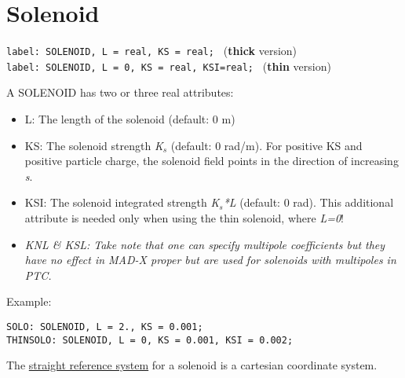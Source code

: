 
\section{Solenoid}
\label{sec:solenoid}

\texttt{label: SOLENOID, L = real, KS = real;           } (\textbf{thick} version) 
\\
\texttt{label: SOLENOID, L = 0,    KS = real, KSI=real; } (\textbf{thin} version) 

A SOLENOID has two or three real attributes: 
\begin{itemize}
   \item L: The length of the solenoid (default: 0 m) 
   \item KS: The solenoid strength \textit{K$_s$} (default: 0
     rad/m). For positive KS and positive particle charge, the solenoid
     field points in the direction of increasing \textit{s}.  
   \item KSI: The solenoid integrated strength \textit{K$_s$*L}
     (default: 0 rad).  This additional attribute is needed only when
     using the thin solenoid,  where \textit{L=0}!     
   \item \textit{ KNL \& KSL:  Take note that one can specify multipole
     coefficients but they have no effect in MAD-X proper but are used
     for solenoids with multipoles in PTC.} 
\end{itemize}

Example: 
\begin{verbatim}
SOLO: SOLENOID, L = 2., KS = 0.001;
THINSOLO: SOLENOID, L = 0, KS = 0.001, KSI = 0.002;
\end{verbatim}

The \href{local_system.html#straight}{straight reference system} for a
solenoid is a cartesian coordinate system. 
 
